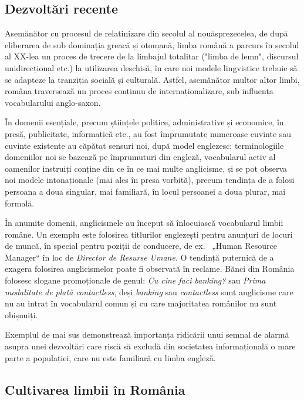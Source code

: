 \documentclass[]{../../metanetpaper}
\begin{document}
\begin{multicols}{2}
\subsection{Dezvoltări recente}

Asemănător cu procesul de relatinizare din secolul al nouăsprezecelea, de după eliberarea de sub dominația greacă și otomană, limba română a parcurs în secolul al XX-lea un proces de trecere de la limbajul totalitar ("limba de lemn", discursul unidirecțional etc.) la utilizarea deschisă, în care noi modele lingvistice trebuie să se adapteze la tranziția socială și culturală. Astfel, asemănător multor altor limbi, româna traversează un proces continuu de internaționalizare, sub influența vocabularului anglo-saxon.

În domenii esențiale, precum științele politice, administrative și economice, în presă, publicitate, informatică etc., au fost împrumutate numeroase cuvinte sau cuvinte existente au căpătat sensuri noi, după model englezesc; terminologiile domeniilor noi se bazează pe împrumuturi din engleză, vocabularul activ al oamenilor instruiți conține din ce în ce mai multe anglicisme, și se pot observa noi modele intonaționale (mai ales în presa vorbită), precum tendința de a folosi persoana a doua singular, mai familiară, în locul persoanei a doua plurar, mai formală.

În anumite domenii, anglicismele au început să înlocuiască vocabularul limbii române. Un exemplu este folosirea titlurilor englezești pentru anunțuri de locuri de muncă, în special pentru poziții de conducere, de ex.~ „Human Resource Manager“ în loc de \textit{Director de Resurse Umane}. O tendință puternică de a exagera folosirea anglicismelor poate fi observată în reclame. Bănci din România folosesc slogane promoționale de genul: \textit{Cu cine faci banking?} sau \textit{Prima modalitate de plată contactless}, deși \textit{banking} sau \textit{contactless} sunt anglicisme care nu au intrat în vocabularul comun și cu care majoritatea românilor nu sunt obișnuiți.

Exemplul de mai sus demonstrează importanța ridicării unui semnal de alarmă asupra unei dezvoltări care riscă să excludă din societatea informațională o mare parte a populației, care nu este familiară cu limba engleză.

\subsection{Cultivarea limbii în România}


\end{multicols}
\end{document}
